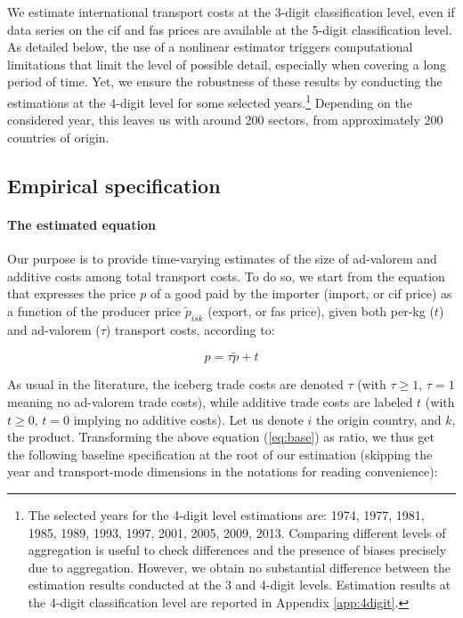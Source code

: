 \documentclass[a4paper,11pt]{article}
\begin{document}
We estimate international transport costs at the 3-digit classification level, even if data series on the cif and fas prices are available at the 5-digit classification level. As detailed below, the use of a nonlinear estimator triggers computational limitations that limit the level of possible detail, especially when covering a long period of time. Yet, we ensure the robustness of these results by conducting the estimations at the 4-digit level for some selected years.\footnote{The selected years for the 4-digit level estimations are: 1974, 1977, 1981, 1985, 1989, 1993, 1997, 2001, 2005, 2009, 2013. Comparing different levels of aggregation is useful to check differences and the presence of biases precisely due to aggregation. However, we obtain no substantial difference between the estimation results conducted at the 3 and 4-digit levels. Estimation results at the 4-digit classification level are reported in Appendix \ref{app:4digit}.} Depending on the considered year, this leaves us with around 200 sectors, from approximately 200 countries of origin.



\subsection{Empirical specification}

\paragraph{The estimated equation} Our purpose is to provide time-varying estimates of the size of ad-valorem and additive costs among total transport costs. To do so, we start from the equation that expresses the price $p$ of a good paid by the importer (import, or cif price) as a function of the producer price $\widetilde{p}_{isk}$ (export, or fas price), given both per-kg ($t$) and ad-valorem ($\tau$) transport costs, according to:

\begin{equation}
p = \tau \widetilde{p}+ t \label{eq:base}
\end{equation}

\noindent As usual in the literature, the iceberg trade costs are denoted $\tau$ (with  $\tau \geq 1$, $\tau=1$ meaning no ad-valorem trade costs), while additive trade costs are labeled $t$ (with $t \geq 0$, $t=0$ implying no additive costs).  Let us denote $i$ the origin country, and $k$, the product. Transforming the above equation (\ref{eq:base}) as ratio, we thus get the following baseline specification at the root of our estimation (skipping the year and transport-mode dimensions in the notations for reading convenience):
\end{document}
